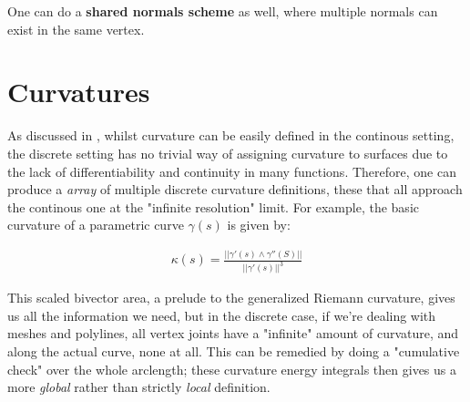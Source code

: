 \spa

One can do a \textbf{shared normals scheme} as well, where
multiple normals can exist in the same vertex.

\section{Curvatures} \label{curvature}

As discussed in \cite{discreteexterior1}, whilst curvature can be
easily defined in the continous setting, the discrete setting has no
trivial way of assigning curvature to surfaces due to the lack of 
differentiability and continuity in many functions. Therefore,
one can produce a \textit{array} of multiple discrete curvature
definitions, these that all approach the continous one at the
"infinite resolution" limit. For example, the basic curvature of a 
parametric curve $\gamma(s)$ is given by:

\begin{example}
\begin{align*}
\kappa(s) = \frac{|| \gamma'(s) \wedge \gamma''(S) ||}{|| \gamma'(s) ||^3}
\end{align*}    
\end{example}


This scaled bivector area, a prelude to the generalized Riemann curvature,
gives us all the information we need, but in the discrete case, if
we're dealing with meshes and polylines, all vertex joints have
a "infinite" amount of curvature, and along the actual curve, none at all.
This can be remedied by doing a "cumulative check" over the whole arclength;
these curvature energy integrals then gives us a more \textit{global}
rather than strictly \textit{local} definition.

